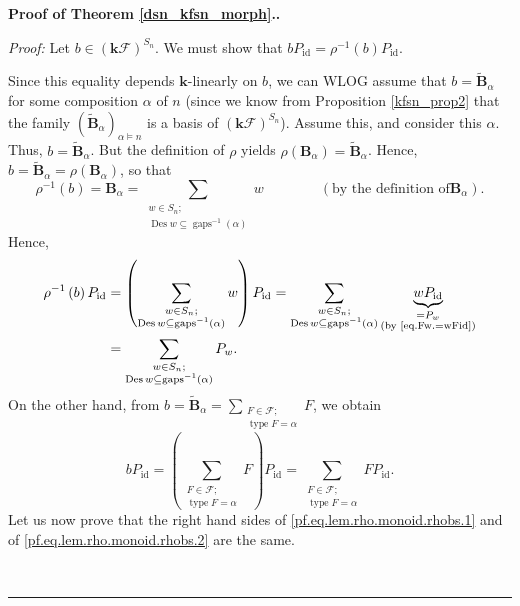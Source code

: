 \documentclass[12pt]{article}
\theoremstyle{definition}%
\theoremstyle{definition}%
\theoremstyle{remark}%
\newcommand{\tup}[1]{\left( #1 \right)}
\newcommand{\kk}{\mathbf{k}}
\newcommand{\kf}{\kk\mathcal{F}}
\newcommand{\kfsn}{\left(\kf\right)^{S_n}}
\newcommand{\BBa}{\mathbf{B}_{\alpha}}
\newcommand{\BBta}{\widetilde{\mathbf{B}}_{\alpha}}
\newcommand{\CF}{\mathcal{F}}
\newcommand{\Des}{\operatorname{Des}}
\newcommand{\gaps}{\operatorname{gaps}}
\newcommand{\type}{\operatorname{type}}
\newcommand{\id}{\operatorname{id}}
\newenvironment{proof}[1][Proof]{\noindent\textbf{#1.} }{\ \rule{0.5em}{0.5em}}
\begin{document}
\begin{proof}[Proof of Theorem \ref{dsn_kfsn_morph}.]
\begin{enumerate}
\textit{Proof:} Let $b\in\kfsn$. We
must show that $bP_{\id}=\rho^{-1}\tup{b} 
P_{\id}$.

Since this equality depends $\kk$-linearly on $b$, we can WLOG assume
that $b = \BBta$ for some composition $\alpha$ of $n$
(since we know from Proposition \ref{kfsn_prop2} that the family $\left(
 \BBta \right)  _{\alpha\models n}$ is a basis of
$\kfsn$). Assume this, and consider
this $\alpha$. Thus, $b = \BBta$. But the definition
of $\rho$ yields $\rho\tup{\BBa} = \BBta $.
Hence, $b = \BBta = \rho\tup{\BBa}$, so that
\[
\rho^{-1}\tup{b}   = \BBa
=\sum\limits_{\substack{w\in S_n;\\
\Des w\subseteq\gaps^{-1}\tup{\alpha}  }}w
\qquad \qquad \left(  \text{by the definition of
} \BBa \right)  .
\]
Hence,
\begin{align}
\rho^{-1}\tup{b}   P_{\id} &  =\left(  \sum
\limits_{\substack{w\in S_n;\\\Des w\subseteq
\gaps^{-1}\tup{\alpha}  }}w\right)
P_{\id}=\sum\limits_{\substack{w\in S_n;\\\Des %
w\subseteq\gaps^{-1}\tup{\alpha}
}}\underbrace{wP_{\id}}_{\substack{=P_{w}\\\text{(by
\eqref{eq.Fw.=wFid})}}}\nonumber\\
&  =\sum\limits_{\substack{w\in S_n;\\\Des w\subseteq
\gaps^{-1}\tup{\alpha}  }}P_{w} .
\label{pf.eq.lem.rho.monoid.rhobs.1}
\end{align}
On the other hand, from $b= \BBta =\sum
\limits_{\substack{F\in\CF;\\\type F=\alpha}}F$, we
obtain
\begin{equation}
bP_{\id}
= \left(  \sum\limits_{\substack{F\in\CF;\\
\type F=\alpha}}F\right)  P_{\id}
= \sum\limits_{\substack{F\in\CF;\\\type F=\alpha
}} FP_{\id}.
\label{pf.eq.lem.rho.monoid.rhobs.2}
\end{equation}
Let us now prove that the right hand sides of
\eqref{pf.eq.lem.rho.monoid.rhobs.1} and of
\eqref{pf.eq.lem.rho.monoid.rhobs.2} are the same.


\end{enumerate}
\end{proof}
\end{document}
